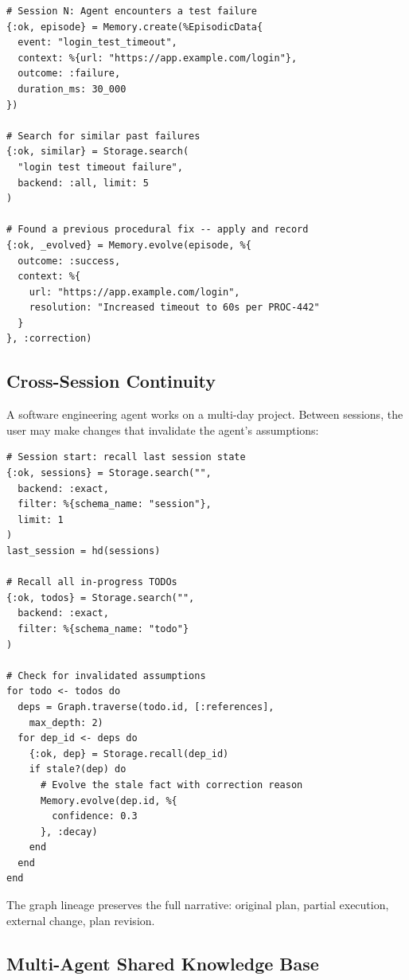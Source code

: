 \documentclass[12pt,a4paper]{article}
\theoremstyle{definition}
\begin{document}
\begin{lstlisting}[caption={Agent learning: recording and evolving from test failures.}, label={lst:case-learning}]
# Session N: Agent encounters a test failure
{:ok, episode} = Memory.create(%EpisodicData{
  event: "login_test_timeout",
  context: %{url: "https://app.example.com/login"},
  outcome: :failure,
  duration_ms: 30_000
})

# Search for similar past failures
{:ok, similar} = Storage.search(
  "login test timeout failure",
  backend: :all, limit: 5
)

# Found a previous procedural fix -- apply and record
{:ok, _evolved} = Memory.evolve(episode, %{
  outcome: :success,
  context: %{
    url: "https://app.example.com/login",
    resolution: "Increased timeout to 60s per PROC-442"
  }
}, :correction)
\end{lstlisting}

\subsection{Cross-Session Continuity}\label{subsec:case-continuity}

A software engineering agent works on a multi-day project.
Between sessions, the user may make changes that invalidate the agent's assumptions:

\begin{lstlisting}[caption={Cross-session context restoration and assumption checking.}, label={lst:case-continuity}]
# Session start: recall last session state
{:ok, sessions} = Storage.search("",
  backend: :exact,
  filter: %{schema_name: "session"},
  limit: 1
)
last_session = hd(sessions)

# Recall all in-progress TODOs
{:ok, todos} = Storage.search("",
  backend: :exact,
  filter: %{schema_name: "todo"}
)

# Check for invalidated assumptions
for todo <- todos do
  deps = Graph.traverse(todo.id, [:references],
    max_depth: 2)
  for dep_id <- deps do
    {:ok, dep} = Storage.recall(dep_id)
    if stale?(dep) do
      # Evolve the stale fact with correction reason
      Memory.evolve(dep.id, %{
        confidence: 0.3
      }, :decay)
    end
  end
end
\end{lstlisting}

The graph lineage preserves the full narrative: original plan, partial execution, external change, plan revision.

\subsection{Multi-Agent Shared Knowledge Base}\label{subsec:case-multi-agent}
\end{document}
